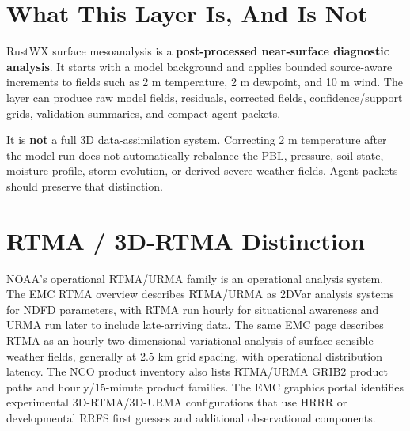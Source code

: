 \documentclass[11pt]{article}
\begin{document}
\section{What This Layer Is, And Is Not}

RustWX surface mesoanalysis is a \textbf{post-processed near-surface diagnostic analysis}.
It starts with a model background and applies bounded source-aware increments to fields
such as 2 m temperature, 2 m dewpoint, and 10 m wind. The layer can produce raw model
fields, residuals, corrected fields, confidence/support grids, validation summaries,
and compact agent packets.

It is \textbf{not} a full 3D data-assimilation system. Correcting 2 m temperature
after the model run does not automatically rebalance the PBL, pressure, soil state,
moisture profile, storm evolution, or derived severe-weather fields. Agent packets
should preserve that distinction.

\section{RTMA / 3D-RTMA Distinction}

NOAA's operational RTMA/URMA family is an operational analysis system. The EMC RTMA
overview describes RTMA/URMA as 2DVar analysis systems for NDFD parameters, with RTMA
run hourly for situational awareness and URMA run later to include late-arriving data.
The same EMC page describes RTMA as an hourly two-dimensional variational analysis of
surface sensible weather fields, generally at 2.5 km grid spacing, with operational
distribution latency. The NCO product inventory also lists RTMA/URMA GRIB2 product
paths and hourly/15-minute product families. The EMC graphics portal identifies
experimental 3D-RTMA/3D-URMA configurations that use HRRR or developmental RRFS first
guesses and additional observational components.
\end{document}
